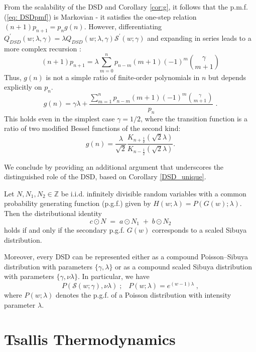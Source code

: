\documentclass[a4paper,12pt]{amsart}
\newcommand{\iid}{i.i.d.}
\theoremstyle{definition}
\theoremstyle{remark}
\begin{document}
From the scalability of the DSD and Corollary \ref{cor:g}, it follows that the p.m.f. (\ref{eq: DSDpmf}) is Markovian -  it satisfies the one-step relation $(n+1)p_{n+1}=p_ng(n)$. However, differentiating $Q_{DSD}^{\prime}(w;\lambda,\gamma)=\lambda Q_{DSD}(w;\lambda,\gamma)\mathcal{S}^{\prime}(w;\gamma)$ and expanding in series leads to a more complex recursion \cite{Christoph1998a}:
\begin{equation}\label{DSDrecur}
    (n+1)p_{n+1}=\lambda \sum_{m=0}^{n}p_{n-m}(m+1)(-1)^m \binom{\gamma}{m+1}
\end{equation}
Thus, $g(n)$ is not a simple ratio of finite-order polynomials in $n$ but depends explicitly on $p_n$. 
\[
g(n)=\gamma\lambda+\frac{\sum_{m=1}^{n}p_{n-m}(m+1)(-1)^m \binom{\gamma}{m+1}}{p_n}\;.
\]
This holds even in the simplest case $\gamma=1/2$, where the transition function is a ratio of two modified Bessel functions of the second kind: 
\[ g(n)= \frac{\lambda}{\sqrt{2}} \frac{K_{n+\frac{1}{2}}\left(\sqrt{2} \lambda \right)}{ K_{n-\frac{1}{2}}\left(\sqrt{2} \lambda \right)}.
\]     

We conclude by providing an additional argument that underscores the distinguished role of the DSD, based on Corollary \ref{DSD_unique}. 

Let $N, N_1, N_2 \in \mathbb{Z}$ be \iid{} infinitely divisible random variables with a common probability generating function (p.g.f.) given by $H(w;\lambda) = P(G(w);\lambda)$. Then the distributional identity
\[
c \odot N \;=\; a \odot N_1 \;+\; b \odot N_2
\]
holds if and only if the secondary p.g.f. $G(w)$ corresponds to a scaled Sibuya distribution.

Moreover, every DSD can be represented either as a compound Poisson–Sibuya distribution with parameters $\{\gamma,\lambda\}$ or as a compound scaled Sibuya distribution with parameters $\{\gamma,\nu\lambda\}$. In particular, we have
\begin{equation}
P(\mathcal{S}(w;\gamma), \nu\lambda)\;;\;\;\; P(w;\lambda) = e^{(w-1)\lambda}\;,
\end{equation}
where $P(w;\lambda)$ denotes the p.g.f. of a Poisson distribution with intensity parameter $\lambda$.


\newpage
\section{Tsallis Thermodynamics}\label{TT}
\end{document}
